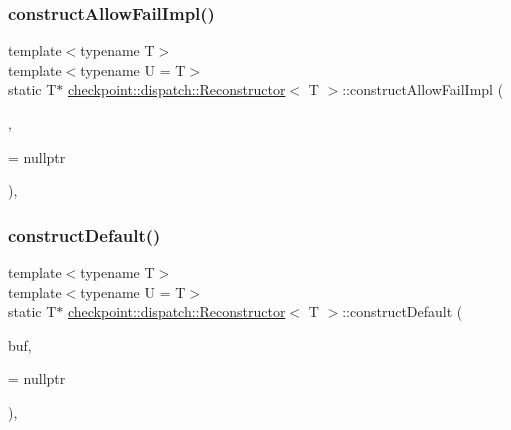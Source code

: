\subsubsection{\texorpdfstring{construct\+Allow\+Fail\+Impl()}{constructAllowFailImpl()}\hspace{0.1cm}{\footnotesize\ttfamily [2/2]}}
{\footnotesize\ttfamily template$<$typename T$>$ \\
template$<$typename U  = T$>$ \\
static T$\ast$ \hyperlink{structcheckpoint_1_1dispatch_1_1_reconstructor}{checkpoint\+::dispatch\+::\+Reconstructor}$<$ T $>$\+::construct\+Allow\+Fail\+Impl (\begin{DoxyParamCaption}\item[{void $\ast$}]{,  }\item[{\hyperlink{namespacecheckpoint_a14b3c81988a2c2d3c935edcc653b6322}{is\+Not\+Constructible}$<$ U $>$ $\ast$}]{ = {\ttfamily nullptr} }\end{DoxyParamCaption})\hspace{0.3cm}{\ttfamily [inline]}, {\ttfamily [static]}}

\mbox{\label{structcheckpoint_1_1dispatch_1_1_reconstructor_af09a6d0312dbed7c8a311350b689794d}} 
\subsubsection{\texorpdfstring{construct\+Default()}{constructDefault()}\hspace{0.1cm}{\footnotesize\ttfamily [1/2]}}
{\footnotesize\ttfamily template$<$typename T$>$ \\
template$<$typename U  = T$>$ \\
static T$\ast$ \hyperlink{structcheckpoint_1_1dispatch_1_1_reconstructor}{checkpoint\+::dispatch\+::\+Reconstructor}$<$ T $>$\+::construct\+Default (\begin{DoxyParamCaption}\item[{void $\ast$}]{buf,  }\item[{\hyperlink{namespacecheckpoint_a58224a3b056d9e2aa73d563871981a7d}{is\+Default\+Cons\+Type}$<$ U $>$ $\ast$}]{ = {\ttfamily nullptr} }\end{DoxyParamCaption})\hspace{0.3cm}{\ttfamily [inline]}, {\ttfamily [static]}}

